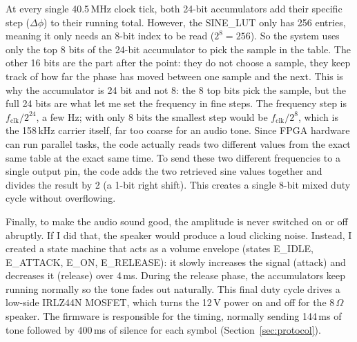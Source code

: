 \documentclass[a4paper,10pt]{article}
\begin{document}
At every single 40.5\,MHz clock tick, both 24-bit accumulators add their specific step
 ($\Delta\phi$) to their running total.
 However, the SINE\_LUT only has 256 entries, meaning it 
 only needs an 8-bit index to be read ($2^8 = 256$). 
 So the system uses only the top 8 bits of the 24-bit accumulator to pick the sample in the
 table. The other 16 bits are the part after the point: they do not choose a sample, they
 keep track of how far the phase has moved between one sample and the next. This is why the
 accumulator is 24 bit and not 8: the 8 top bits pick the sample, but the full 24 bits are
 what let me set the frequency in fine steps. The frequency step is $f_\mathrm{clk}/2^{24}$, a few Hz; with only
  8 bits the smallest step would be $f_\mathrm{clk}/2^{8}$, which is the 158\,kHz carrier
  itself, far too coarse for an audio tone. Since FPGA hardware can run parallel tasks,
  the code actually reads two different values from the exact 
  same table at the exact same time. To send these two different
   frequencies to a single output pin, the code adds the two
    retrieved sine values together and divides the result by 2
    (a 1-bit right shift).
    This creates a single 8-bit mixed duty cycle without overflowing.

Finally, to make the audio sound good, the amplitude is never switched on or off abruptly. If I did that, the speaker would produce a loud clicking noise. Instead, I created a state machine that acts as a volume envelope (states E\_IDLE, E\_ATTACK, E\_ON, E\_RELEASE): it slowly increases the signal (attack) and decreases it (release) over 4\,ms. During the release phase, the accumulators keep running normally so the tone fades out naturally. This final duty cycle drives a low-side IRLZ44N MOSFET, which turns the 12\,V power on and off for the 8\,$\Omega$ speaker. The firmware is responsible for the timing, normally sending 144\,ms of tone followed by 400\,ms of silence for each symbol (Section~\ref{sec:protocol}).
\end{document}
